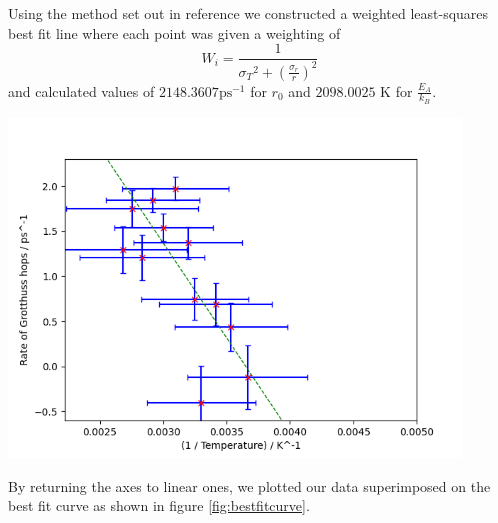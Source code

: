 \documentclass{article}
\newenvironment{Figure}{\par\medskip\noindent\minipage{\linewidth}}{\endminipage\par\medskip}
\begin{document}
\begin{multicols}{2}
Using the method set out in reference \cite{gatland1993weight} we constructed a weighted least-squares best fit line where each point was given a weighting of 
\begin{equation}
	W_{i}=\frac{1}{{\sigma_{T}}^{2}+(\frac{\sigma_{r}}{r})^{2}}
\end{equation}
and calculated values of $2148.3607\text{ps}^{-1}$ for $r_{0}$ and $2098.0025$ K for $\frac{E_{A}}{k_{B}}$.
\begin{Figure}
	\centering
	\includegraphics[width=0.9\textwidth]{figures/bestfitline.png}
	\label{fig:bestfitline}	
\end{Figure}

By returning the axes to linear ones, we plotted our data superimposed on the best fit curve as shown in figure \ref{fig:bestfitcurve}.


\end{multicols}
\end{document}
